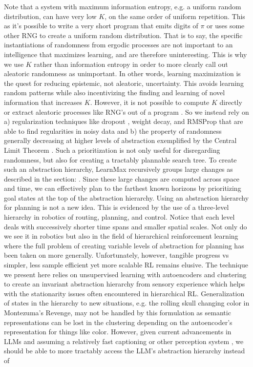 \documentclass{article}
\begin{document}
Note that a system with maximum information entropy, e.g. a uniform random distribution, can have very low $K$, on the same order of uniform repetition. This as it's possible to write a very short program that emits digits of $\pi$ or uses some other RNG to create a uniform random distribution.
That is to say, the specific instantiations of randomness from ergodic processes are not important to an intelligence that maximizes learning, and are therefore uninteresting. This is why we use $K$ rather than information entropy in order to more clearly call out aleatoric randomness as unimportant. In other words, learning maximization is the quest for reducing epistemic, not aleatoric, uncertainty. This avoids learning random patterns while also incentivizing the finding and learning of novel information that increases $K$. However, it is not possible to compute $K$ directly or extract aleatoric processes like RNG's out of a program \cite{wiki-kolm-cpx-uncomput}. So we instead rely on a) regularization techniques like dropout \cite{srivastava2014dropout}, weight decay\cite{krogh1991simple}\cite{loshchilov2017decoupled}, and RMSProp \cite{hinton2012}\cite{kingma2017adam} that are able to find regularities in noisy data and b) the property of randomness generally decreasing at higher levels of abstraction exemplified by the Central Limit Theorem \cite{wiki-cent-lim-theo}. Such a prioritization is not only useful for disregarding randomness, but also for creating a tractably plannable search tree. To create such an abstraction hierarchy, LearnMax recursively groups large changes as described in the section: . Since these large changes are computed across space and time, we can effectively plan to the farthest known horizons by prioritizing goal states at the top of the abstraction hierarchy. Using an abstraction hierarchy for planning is not a new idea. This is evidenced by the use of a three-level hierarchy in robotics \cite{gat1998three} of routing, planning, and control. Notice that each level deals with successively shorter time spans and smaller spatial scales. Not only do we see it in robotics but also in the field of hierarchical reinforcement learning\cite{BerliacHierachialRL2019} where the full problem of creating variable levels of abstraction for planning has been taken on more generally. Unfortunately, however, tangible progress vs simpler, less sample efficient yet more scalable RL\cite{openai2019dota} remains elusive. The technique we present here relies on unsupervised learning with autoencoders and clustering to create an invariant abstraction hierarchy from sensory experience which helps with the stationarity\cite{BerliacHierachialRL2019} issues often encountered in hierarchical RL. Generalization of states in the hierarchy to new situations, e.g. the rolling skull changing color in Montezuma's Revenge, may not be handled by this formulation as semantic representations can be lost in the clustering depending on the autoencoder's representation for things like color. However, given current advancements in LLMs and assuming a relatively fast captioning\cite{li2022mplug} or other perception system\cite{wang2022yolov7} \cite{zhang2023videollama}, we should be able to more tractably access the LLM's abstraction hierarchy instead of 
\end{document}

